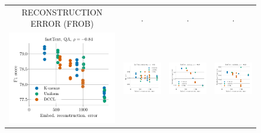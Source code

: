 \begin{figure}
\begin{tabular}{@{\hskip -0.0in}c@{\hskip -0.0in}c@{\hskip -0.0in}c@{\hskip -0.0in}c@{\hskip -0.0in}}
		
		RECONSTRUCTION ERROR (FROB) & . & . & . \\		
		\includegraphics[width=.245\linewidth]{figures/fasttext1m_qa_best-f1_vs_embed-frob-error_linx.pdf} &
		\includegraphics[width=.245\linewidth]{figures/fasttext1m_sentiment_trec_test-acc_vs_embed-frob-error_linx.pdf} &
		\includegraphics[width=.245\linewidth]{figures/fasttext1m_intrinsics_analogy-avg-score_vs_embed-frob-error_linx.pdf} &
		\includegraphics[width=.245\linewidth]{figures/fasttext1m_intrinsics_similarity-avg-score_vs_embed-frob-error_linx.pdf} \\
		

\end{tabular}
\end{figure}
